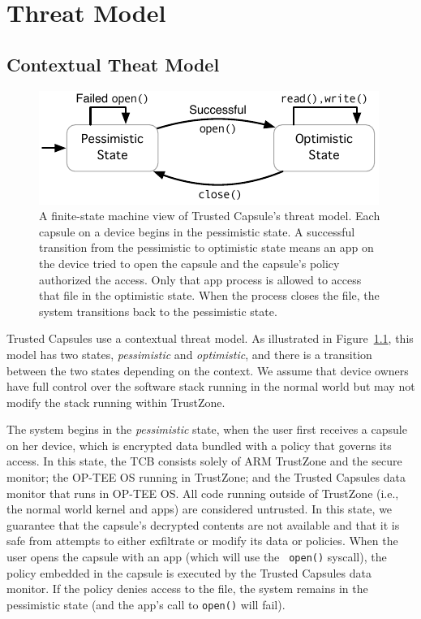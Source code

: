 \chapter{Threat Model}
\label{ch:ThreatModel}
\section{Contextual Theat Model}
\begin{figure}
  \centering
  \includegraphics[width=\columnwidth]{fig/state-machine.pdf}
  \caption{A finite-state machine view of Trusted Capsule's threat model. Each
    capsule on a device begins in the pessimistic state. A successful transition
    from the pessimistic to optimistic state means an app on the device tried to
    open the capsule and the capsule's policy authorized the access. Only that
    app process is allowed to access that file in the optimistic state. When the
    process closes the file, the system transitions back to the pessimistic
    state.}
  \label{fig:threatmodelstatediag}
\end{figure}

Trusted Capsules use a contextual threat model. As illustrated in
Figure~\ref{fig:threatmodelstatediag}, this model has two states, {\em
  pessimistic} and {\em optimistic}, and there is a transition between
the two states depending on the context. We assume that device owners
have full control over the software stack running in the normal world
but may not modify the stack running within TrustZone.

The system begins in the {\em pessimistic} state, when the user first receives a
capsule on her device, which is encrypted data bundled with a policy that
governs its access. In this state, the TCB consists solely of ARM TrustZone and
the secure monitor; the OP-TEE OS running in TrustZone; and the Trusted Capsules
data monitor that runs in OP-TEE OS. All code running outside of TrustZone
(i.e., the normal world kernel and apps) are considered untrusted. In this
state, we guarantee that the capsule's decrypted contents are not available and
that it is safe from attempts to either exfiltrate or modify its data or
policies. When the user opens the capsule with an app (which will use the {\tt
  open()} syscall), the policy embedded in the capsule is executed by the
Trusted Capsules data monitor. If the policy denies access to the file, the
system remains in the pessimistic state (and the app's call to {\tt open()} will
fail).

